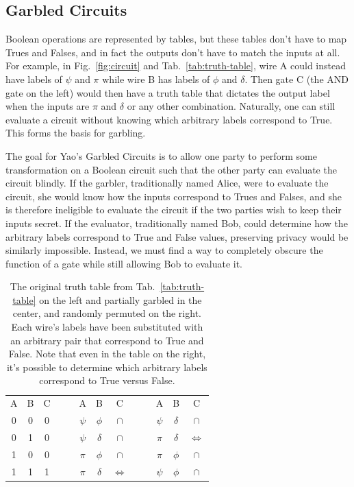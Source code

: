 \subsection{Garbled Circuits}\label{sec:gc}
Boolean operations are represented by tables, but these tables don't have to map Trues and Falses, and in fact the outputs don't have to match the inputs at all. For example, in Fig.~\ref{fig:circuit} and Tab.~\ref{tab:truth-table}, wire A could instead have labels of $\psi$ and $\pi$ while wire B has labels of $\phi$ and $\delta$. Then gate C (the AND gate on the left) would then have a truth table that dictates the output label when the inputs are $\pi$ and $\delta$ or any other combination. Naturally, one can still evaluate a circuit without knowing which arbitrary labels correspond to True. This forms the basis for garbling.

The goal for Yao's Garbled Circuits is to allow one party to perform some transformation on a Boolean circuit such that the other party can evaluate the circuit blindly. If the garbler, traditionally named Alice, were to evaluate the circuit, she would know how the inputs correspond to Trues and Falses, and she is therefore ineligible to evaluate the circuit if the two parties wish to keep their inputs secret. If the evaluator, traditionally named Bob, could determine how the arbitrary labels correspond to True and False values, preserving privacy would be similarly impossible. Instead, we must find a way to completely obscure the function of a gate while still allowing Bob to evaluate it.

\begin{table}[t]
	\centering
	\begin{tabular}{cc|c   cc   cc|c   cc   cc|c}
		A & B & C &&& A      & B        & C                 &&& A     & B      & C \\
		\cmidrule{1-3}\cmidrule{6-8}                            \cmidrule{11-13}
		0 & 0 & 0 &&& $\psi$ & $\phi  $ & $\cap$            &&& $\psi$ & $\delta$ & $\cap$ \\
		0 & 1 & 0 &&& $\psi$ & $\delta$ & $\cap$            &&& $\pi $ & $\delta$ & $\Leftrightarrow$ \\
		1 & 0 & 0 &&& $\pi $ & $\phi  $ & $\cap$            &&& $\pi $ & $\phi$   & $\cap$ \\
		1 & 1 & 1 &&& $\pi $ & $\delta$ & $\Leftrightarrow$ &&& $\psi$ & $\phi$   & $\cap$ \\
	\end{tabular}
	\caption{The original truth table from Tab.~\ref{tab:truth-table} on the left and partially garbled in the center, and randomly permuted on the right. Each wire's labels have been substituted with an arbitrary pair that correspond to True and False. Note that even in the table on the right, it's possible to determine which arbitrary labels correspond to True versus False.}%
	\label{tab:garbled-table}
\end{table}

